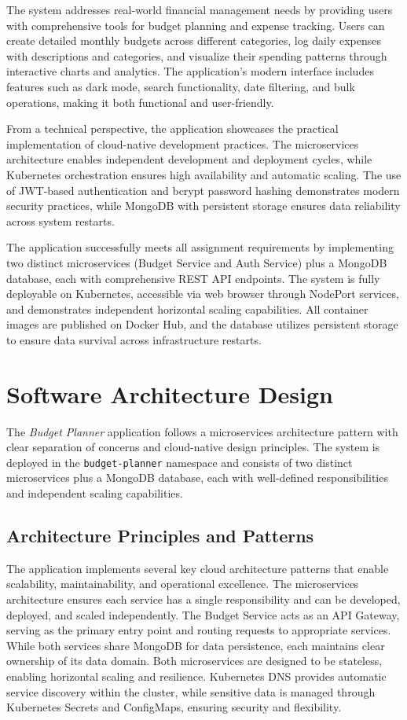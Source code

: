 \documentclass[conference]{IEEEtran}
\begin{document}
The system addresses real-world financial management needs by providing users with comprehensive tools for budget planning and expense tracking. Users can create detailed monthly budgets across different categories, log daily expenses with descriptions and categories, and visualize their spending patterns through interactive charts and analytics. The application's modern interface includes features such as dark mode, search functionality, date filtering, and bulk operations, making it both functional and user-friendly.

From a technical perspective, the application showcases the practical implementation of cloud-native development practices. The microservices architecture enables independent development and deployment cycles, while Kubernetes orchestration ensures high availability and automatic scaling. The use of JWT-based authentication and bcrypt password hashing demonstrates modern security practices, while MongoDB with persistent storage ensures data reliability across system restarts.

The application successfully meets all assignment requirements by implementing two distinct microservices (Budget Service and Auth Service) plus a MongoDB database, each with comprehensive REST API endpoints. The system is fully deployable on Kubernetes, accessible via web browser through NodePort services, and demonstrates independent horizontal scaling capabilities. All container images are published on Docker Hub, and the database utilizes persistent storage to ensure data survival across infrastructure restarts.

\section{\textbf{Software Architecture Design}}
The \emph{Budget Planner} application follows a microservices architecture pattern with clear separation of concerns and cloud-native design principles. The system is deployed in the \texttt{budget-planner} namespace and consists of two distinct microservices plus a MongoDB database, each with well-defined responsibilities and independent scaling capabilities.

\subsection{Architecture Principles and Patterns}
The application implements several key cloud architecture patterns that enable scalability, maintainability, and operational excellence. The microservices architecture ensures each service has a single responsibility and can be developed, deployed, and scaled independently. The Budget Service acts as an API Gateway, serving as the primary entry point and routing requests to appropriate services. While both services share MongoDB for data persistence, each maintains clear ownership of its data domain. Both microservices are designed to be stateless, enabling horizontal scaling and resilience. Kubernetes DNS provides automatic service discovery within the cluster, while sensitive data is managed through Kubernetes Secrets and ConfigMaps, ensuring security and flexibility.
\end{document}

